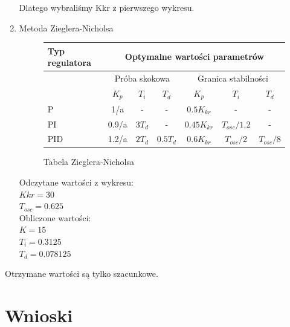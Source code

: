 \documentclass[a4paper,10pt]{article}
\begin{document}
\begin{enumerate}
		Dlatego wybraliśmy Kkr z pierwszego wykresu.\newline
	\item Metoda Zieglera-Nicholsa	
\begin{figure}[!h]
\begin{tabular}{ | l | c | c | c | c | c | c | }
\hline
  Typ regulatora & \multicolumn{6}{|c|}{Optymalne wartości parametrów} \\   \hline
   & \multicolumn{3}{|c|}{Próba skokowa} & \multicolumn{3}{|c|}{Granica stabilności} \\   \hline
   & $K_{p}$ & $T_{i}$ & $T_{d}$ & $K_{p}$ & $T_{i}$ & $T_{d}$\\   \hline
   P & 1/a & - & - & $0.5K_{kr}$ & - & - \\   \hline
   PI & 0.9/a & $3 T_{d}$ & - & $0.45K_{kr}$ & $T_{osc}/1.2$ & - \\   \hline
   PID & 1.2/a & $2T_{d}$ & $0.5T_d$ & $0.6K_{kr}$ & $T_{osc}/2$ & $T_{osc}/8$ \\   \hline
\hline
\end{tabular}
	\caption{Tabela Zieglera-Nicholsa}
\end{figure}
\newline
Odczytane wartości z wykresu:\\
$Kkr=30$\\
$T_{osc}=0.625$\\
Obliczone wartości:\\
$K=15$\\
$T_{i}=0.3125$\\
$T_{d}=0.078125$\\
\end{enumerate}
Otrzymane wartości są tylko szacunkowe.

\section{Wnioski}
\end{document}
